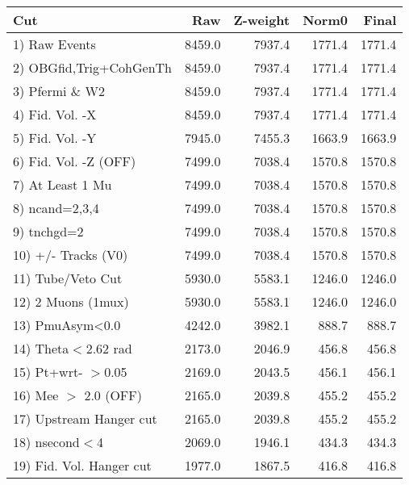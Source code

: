  \begin{table}[h!]\centering
 \begin{tabular}{||l||r|r|r|r||}
 \hline
 \hline
 Cut & Raw & Z-weight & Norm0 & Final \\
 \hline
  1) Raw Events           &      8459.0 &      7937.4 &      1771.4 &      1771.4 \\
  2) OBGfid,Trig+CohGenTh &      8459.0 &      7937.4 &      1771.4 &      1771.4 \\
  3) Pfermi \& W2         &      8459.0 &      7937.4 &      1771.4 &      1771.4 \\
  4) Fid. Vol. -X         &      8459.0 &      7937.4 &      1771.4 &      1771.4 \\
  5) Fid. Vol. -Y         &      7945.0 &      7455.3 &      1663.9 &      1663.9 \\
  6) Fid. Vol. -Z (OFF)   &      7499.0 &      7038.4 &      1570.8 &      1570.8 \\
  7) At Least 1 Mu        &      7499.0 &      7038.4 &      1570.8 &      1570.8 \\
  8) ncand=2,3,4          &      7499.0 &      7038.4 &      1570.8 &      1570.8 \\
  9) tnchgd=2             &      7499.0 &      7038.4 &      1570.8 &      1570.8 \\
 10) +/- Tracks (V0)      &      7499.0 &      7038.4 &      1570.8 &      1570.8 \\
 11) Tube/Veto Cut        &      5930.0 &      5583.1 &      1246.0 &      1246.0 \\
 12) 2 Muons (1mux)       &      5930.0 &      5583.1 &      1246.0 &      1246.0 \\
 13) PmuAsym<0.0          &      4242.0 &      3982.1 &       888.7 &       888.7 \\
 14) Theta$<$2.62 rad     &      2173.0 &      2046.9 &       456.8 &       456.8 \\
 15) Pt+wrt- $>$0.05      &      2169.0 &      2043.5 &       456.1 &       456.1 \\
 16) Mee $>$ 2.0  (OFF)   &      2165.0 &      2039.8 &       455.2 &       455.2 \\
 17) Upstream Hanger cut  &      2165.0 &      2039.8 &       455.2 &       455.2 \\
 18) nsecond$<$4          &      2069.0 &      1946.1 &       434.3 &       434.3 \\
 19) Fid. Vol. Hanger cut &      1977.0 &      1867.5 &       416.8 &       416.8 \\

\end{tabular}
\end{table}
